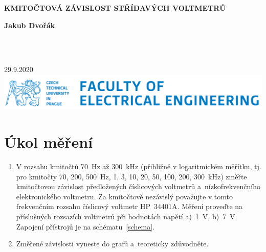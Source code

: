 \documentclass[a4paper,12pt]{article}   %
\begin{document}

\begin{titlepage}


    \begin{center}
        \vspace*{1cm}
            
        \Huge
        \textbf{KMITOČTOVÁ ZÁVISLOST STŘÍDAVÝCH VOLTMETRŮ}
            
        \vspace{0.5cm}
        \LARGE
        
            
        \vspace{1.5cm}
            
        \textbf{Jakub Dvořák}
            
        \vfill
            
        
            
        \vspace{0.8cm}
            
        
            
        \Large
        \\
        \
            
        29.9.2020\\
        \vspace*{.5cm}
        \includegraphics[width=.4\textwidth]{logo-cvut-fee.png}\\
        
            
    \end{center}
\end{titlepage}

\setcounter{page}{0} %
\pagestyle{empty} %

\newpage
\section{Úkol měření}
\label{zadani}
\begin{enumerate}[label=\alph*)]
    \item V rozsahu kmitočtů 70~Hz až 300~kHz (přibližně v logaritmickém měřítku, tj. pro kmitočty 70, 200, 500~Hz, 1, 3, 10, 20, 50, 100, 200, 300~kHz) změřte kmitočtovou závislost předložených číslicových voltmetrů a~nízkofrekvenčního elektronického voltmetru. Za kmitočtově nezávislý považujte v tomto frekvenčním rozsahu číslicový voltmetr HP~34401A. Měření proveďte na příslušných rozsazích voltmetrů při hodnotách napětí a)~1~V, b)~7~V. Zapojení přístrojů je na schématu~\ref{schema}.
    \item Změřené závislosti vyneste do grafů a~teoreticky zdůvodněte.
\end{enumerate}
\end{document}
